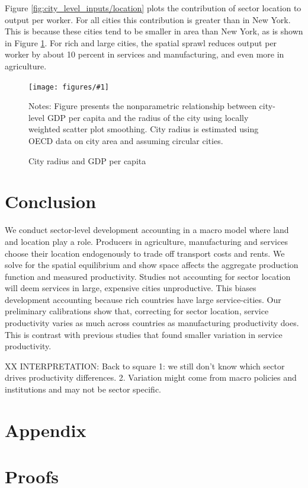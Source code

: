 \documentclass[12pt]{article}
\newcommand{\dofigure}[3]{\begin{figure}
\begin{centering}
\texttt{[image: figures/\#1]}
  \caption{#2\label{fig:#1}}
\end{centering}

\noindent \footnotesize{#3}
\end{figure}}
\begin{document}
Figure \ref{fig:city_level_inputs/location} plots the contribution of sector location to output per worker. For all cities this contribution is greater than in New York. This is because these cities tend to be smaller in area than New York, as is shown in Figure \ref{fig:city_level_inputs/city_radius}. For rich and large cities, the spatial sprawl reduces output per worker by about 10 percent in services and manufacturing, and even more in agriculture.

\dofigure{city_level_inputs/city_radius}{City radius and GDP per capita}{Notes: Figure presents the nonparametric relationship between city-level GDP per capita and the radius of the city using locally weighted scatter plot smoothing. City radius is estimated using OECD data on city area and assuming circular cities.}


\section{Conclusion}
We conduct sector-level development accounting in a macro model where land and location play a role. Producers in agriculture, manufacturing and services choose their location endogenously to trade off transport costs and rents. We solve for the spatial equilibrium and show space affects the aggregate production function and measured productivity. Studies not accounting for sector location will deem services in large, expensive cities unproductive. This biases development accounting because rich countries have large service-cities. Our preliminary calibrations show that, correcting for sector location, service productivity varies as much across countries as manufacturing productivity does. This is contrast with previous studies that found smaller variation in service productivity.

XX INTERPRETATION: Back to square 1: we still don’t know which sector drives productivity differences.
2. Variation might come from macro policies and institutions and may not be sector specific.

\clearpage




\clearpage

\appendix
\section*{Appendix}
\section{Proofs}
\end{document}
